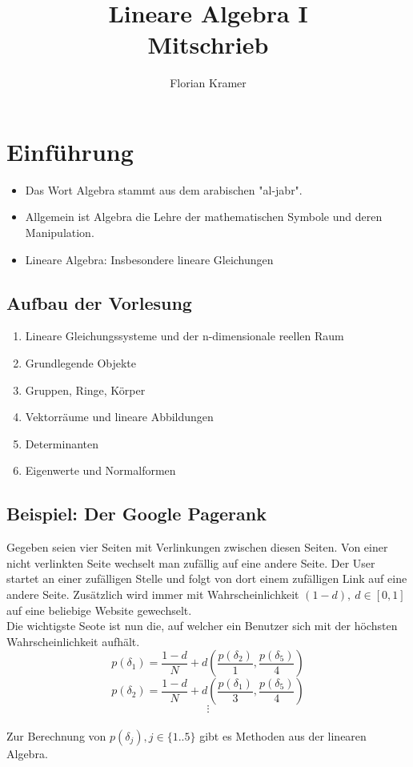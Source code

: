 \documentclass{article}
\title{Lineare Algebra I\\Mitschrieb}
\author{Florian Kramer}
\begin{document}
\maketitle
\tableofcontents
\pagebreak

\section{Einführung}
\begin{itemize}
\item{Das Wort Algebra stammt aus dem arabischen "al-jabr".}
\item{Allgemein ist Algebra die Lehre der mathematischen Symbole und deren Manipulation.}
\item{Lineare Algebra: Insbesondere lineare Gleichungen}
\end{itemize}

\subsection{Aufbau der Vorlesung}
\begin{enumerate}
\item{Lineare Gleichungssysteme und der n-dimensionale reellen Raum}
\item{Grundlegende Objekte}
\item{Gruppen, Ringe, Körper}
\item{Vektorräume und lineare Abbildungen}
\item{Determinanten}
\item{Eigenwerte und Normalformen}
\end{enumerate}

\subsection{Beispiel: Der Google Pagerank}
Gegeben seien vier Seiten mit Verlinkungen zwischen diesen Seiten. Von einer nicht verlinkten Seite wechselt man zufällig auf eine andere Seite. Der User startet an einer zufälligen Stelle und folgt von dort einem zufälligen Link auf eine andere Seite. Zusätzlich wird immer mit Wahrscheinlichkeit $(1-d), \ d \in [0, 1]$ auf eine beliebige Website gewechselt.\\
Die wichtigste Seote ist nun die, auf welcher ein Benutzer sich mit der höchsten Wahrscheinlichkeit aufhält.\\
$$
p(\delta_1) = \frac{1-d}{N} + d\left(\frac{p(\delta_2)}{1}, \frac{p(\delta_5)}{4}\right)$$$$
p(\delta_2) = \frac{1-d}{N} + d\left(\frac{p(\delta_1)}{3}, \frac{p(\delta_5)}{4}\right)$$$$
\vdots
$$\\
Zur Berechnung von $p(\delta_j), j \in \{1..5\}$ gibt es Methoden aus der linearen Algebra.
\end{document}
